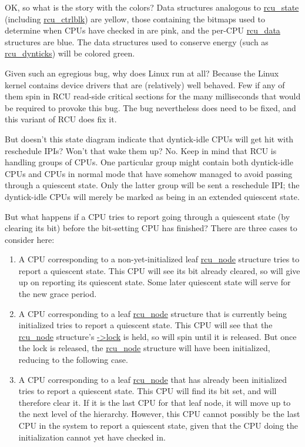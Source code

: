 \QuickQ{}
	OK, so what is the story with the colors?
\QuickA{}
	Data structures analogous to \url{rcu_state} (including
	\url{rcu_ctrlblk}) are yellow,
	those containing the bitmaps used to determine when CPUs have checked
	in are pink,
	and the per-CPU \url{rcu_data} structures are blue.
	The data structures used to conserve energy
	(such as \url{rcu_dynticks}) will be colored green.

\QuickQ{}
	Given such an egregious bug, why does Linux run at all?
\QuickA{}
	Because the Linux kernel contains device drivers that are (relatively)
	well behaved.
	Few if any of them spin in RCU read-side critical sections for the
	many milliseconds that would be required to provoke this bug.
	The bug nevertheless does need to be fixed, and this variant of
	RCU does fix it.

\QuickQ{}
	But doesn't this state diagram indicate that dyntick-idle CPUs will
	get hit with reschedule IPIs?  Won't that wake them up?
\QuickA{}
	No.
	Keep in mind that RCU is handling groups of CPUs.
	One particular group might contain both dyntick-idle CPUs and
	CPUs in normal mode that have somehow managed to avoid passing through
	a quiescent state.
	Only the latter group will be sent a reschedule IPI; the dyntick-idle
	CPUs will merely be marked as being in an extended quiescent state.

\QuickQ{}
	But what happens if a CPU tries to report going through a quiescent
	state (by clearing its bit) before the bit-setting CPU has finished?
\QuickA{}
	There are three cases to consider here:

	\begin{enumerate}
	\item	A CPU corresponding to a non-yet-initialized leaf
		\url{rcu_node} structure tries to report a quiescent state.
		This CPU will see its bit already cleared, so will give up on
		reporting its quiescent state.
		Some later quiescent state will serve for the new grace period.
	\item	A CPU corresponding to a leaf \url{rcu_node} structure that
		is currently being initialized tries to report a quiescent
		state.
		This CPU will see that the \url{rcu_node} structure's
		\url{->lock} is held, so will spin until it is
		released.
		But once the lock is released, the \url{rcu_node}
		structure will have been initialized, reducing to the
		following case.
	\item	A CPU corresponding to a leaf \url{rcu_node} that has
		already been initialized tries to report a quiescent state.
		This CPU will find its bit set, and will therefore clear it.
		If it is the last CPU for that leaf node, it will
		move up to the next level of the hierarchy.
		However, this CPU cannot possibly be the last CPU in the
		system to report a quiescent state, given that the CPU
		doing the initialization cannot yet have checked in.
	\end{enumerate}


